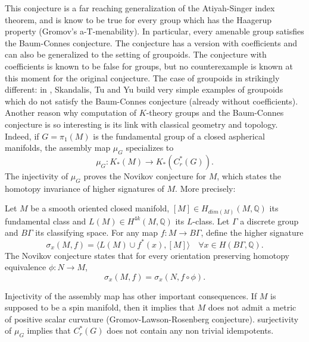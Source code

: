 This conjecture is a far reaching generalization of the Atiyah-Singer index theorem, and is know to be true for every group which has the Haagerup property (Gromov's a-T-menability). In particular, every amenable group satisfies the Baum-Connes conjecture. The conjecture has a version with coefficients and can also be generalized to the setting of groupoids. The conjecture with coefficients is known to be false for groups, but no counterexample is known at this moment for the original conjecture. The case of groupoids in strikingly different: in \cite{SkTuYu}, Skandalis, Tu and Yu build very simple examples of groupoids which do not satisfy the Baum-Connes conjecture (already without coefficients).\\

Another reason why computation of $K$-theory groups and the Baum-Connes conjecture is so interesting is its link with classical geometry and topology. Indeed, if $G=\pi_1(M)$ is the fundamental group of a closed aspherical manifolds, the assembly map $\mu_G$ specializes to 
\[\mu_G : K_*(M)\rightarrow K_*(C^*_r(G)).\]
The injectivity of $\mu_G$ proves the Novikov conjecture for $M$, which states the homotopy invariance of higher signatures of $M$. More precisely:

\begin{conjecture} Let $M$ be a smooth oriented closed manifold, 
$[M]\in H_{dim(M)}(M,\mathbb Q)$ its fundamental class and
$ L(M)\in H^{4k}(M,\mathbb Q)$ its $L$-class. Let $\Gamma$ a discrete group and $B\Gamma$ its classifying space. 
For any map $f: M \rightarrow B\Gamma$, define the higher signature 
\[\sigma_x(M,f) = \langle L(M)\cup f^*(x),[M] \rangle \quad \forall x \in H(B\Gamma, \mathbb Q).\]
The Novikov conjecture states that for every orientation preserving homotopy equivalence $\phi : N\rightarrow M$,
\[\sigma_x(M,f)= \sigma_x(N,f\circ \phi).\]
\end{conjecture}

Injectivity of the assembly map has other important consequences. If $M$ is supposed to be a spin manifold, then it implies that $M$ does not admit a metric of positive scalar curvature (Gromov-Lawson-Rosenberg conjecture). surjectivity of $\mu_G$ implies that $C^*_r(G)$ does not contain any non trivial idempotents.\\

